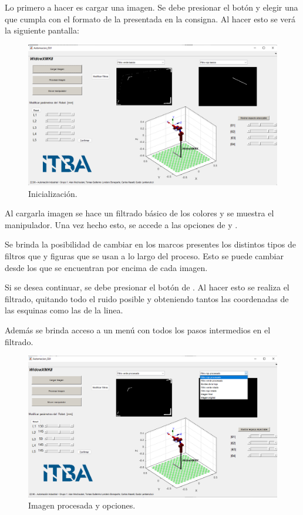 

Lo primero a hacer es cargar una imagen. Se debe presionar el botón  y elegir una que cumpla con el formato de la presentada en la consigna. Al hacer esto se verá la siguiente pantalla:
\begin{figure}[H]
	\centering
	\includegraphics[width=\linewidth]{init}
	\caption{Inicialización.}	
	\label{fig:Inicializacion}
\end{figure}

Al cargarla imagen se hace un filtrado básico de los colores y se muestra el manipulador. 
Una vez hecho esto, se accede a las opciones de  y .

Se brinda la posibilidad de cambiar en los marcos presentes los distintos tipos de filtros que y figuras que se usan a lo largo del proceso. Esto se puede cambiar desde los  que se encuentran por encima de cada imagen.

Si se desea continuar, se debe presionar el botón de . Al hacer esto se realiza el filtrado, quitando todo el ruido posible y obteniendo tantos las coordenadas de las esquinas como las de la linea.

Además se brinda acceso a un menú con todos los pasos intermedios en el filtrado.
\begin{figure}[H]
	\centering
	\includegraphics[width=\linewidth]{ddm}
	\caption{Imagen procesada y opciones.}	
	\label{fig:ddm}
\end{figure}

